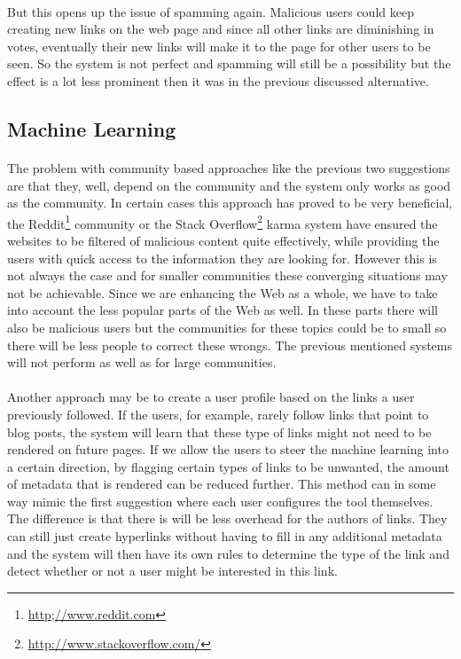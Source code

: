 		\paragraph{}
		But this opens up the issue of spamming again. Malicious users could keep creating new links on the web page and since all other links are diminishing in votes, eventually their new links will make it to the page for other users to be seen. So the system is not perfect and spamming will still be a possibility but the effect is a lot less prominent then it was in the previous discussed alternative.

	\subsection{Machine Learning} \label{ssub:Machine Learning}
		\paragraph{}
		The problem with community based approaches like the previous two suggestions are that they, well, depend on the community and the system only works as good as the community. In certain cases this approach has proved to be very beneficial, the Reddit\footnote{\url{http;//www.reddit.com}} community or the Stack Overflow\footnote{\url{http://www.stackoverflow.com/}} karma system have ensured the websites to be filtered of malicious content quite effectively, while providing the users with quick access to the information they are looking for. However this is not always the case and for smaller communities these converging situations may not be achievable. Since we are enhancing the Web as a whole, we have to take into account the less popular parts of the Web as well. In these parts there will also be malicious users but the communities for these topics could be to small so there will be less people to correct these wrongs. The previous mentioned systems will not perform as well as for large communities.
		\paragraph{}
		Another approach may be to create a user profile based on the links a user previously followed. If the users, for example, rarely follow links that point to blog posts, the system will learn that these type of links might not need to be rendered on future pages. If we allow the users to steer the machine learning into a certain direction, by flagging certain types of links to be unwanted, the amount of metadata that is rendered can be reduced further. This method can in some way mimic the first suggestion where each user configures the tool themselves. The difference is that there is will be less overhead for the authors of links. They can still just create hyperlinks without having to fill in any additional metadata and the system will then have its own rules to determine the type of the link and detect whether or not a user might be interested in this link.
